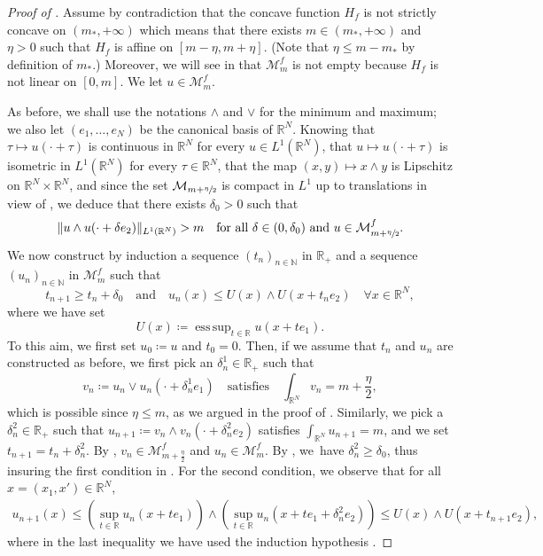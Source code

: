 \documentclass[JEP,XML,SOM,Unicode,published]{cedram}
\theoremstyle{plain}
\theoremstyle{definition}
\newcommand{\N}{\mathbb{N}}
\newcommand{\R}{\mathbb{R}}
\DeclarePairedDelimiter{\norm}{\lVert}{\rVert}
\DeclareMathOperator*{\esssup}{ess\,sup}
\begin{document}
\begin{proof}[Proof of ]
Assume by contradiction that the concave function \(H_f\) is not strictly concave on \((m_\ast,+\infty)\) which means that there exists \(m\in (m_\ast,+\infty)\) and \(\eta>0\) such that \(H_f\) is affine on \([m-\eta,m+\eta]\). (Note that \(\eta\leq m-m_\ast\) by definition of \(m_\ast\).) Moreover, we will see in  that \(\mathcal{M}^f_m\) is not empty because $H_f$ is not linear on $[0,m]$. We let \(u\in \mathcal{M}^f_m\).

As before, we shall use the notations \(\wedge\) and \(\vee\) for the minimum and maximum; we also let \((e_1,\dots,e_N)\) be the canonical basis of \(\R^N\). Knowing that \(\tau \mapsto u(\cdot+\tau)\) is continuous in $\R^N$ for every $u\in L^1(\R^N)$, that \(u\mapsto u(\cdot+\tau)\) is isometric in \(L^1(\R^N)\) for every \(\tau\in\R^N\), that the map \((x,y)\mapsto x\wedge y\) is Lipschitz on \(\R^N\times\R^N\), and since the set \(\mathcal{M}_{m+\sfrac{\eta}{2}}\) is compact in \(L^1\) up to translations in view of , we deduce that there exists \(\delta_0>0\) such that
\begin{equation}\label{UnifContTrans}
\norm{u\wedge u(\cdot+\delta e_2)}_{L^1(\R^N)}>m\quad\text{for all }\delta\in (0,\delta_0)\text{ and }u\in\mathcal{M}^f_{m+\sfrac{\eta}{2}}.
\end{equation}
We now construct by induction a sequence \((t_n)_{n\in\N}\) in \(\R_+\) and a sequence \((u_n)_{n\in\N}\) in \(\mathcal{M}^f_m\) such that
\begin{equation}\label{inductionHyp}
t_{n+1}\geq t_n+\delta_0\quad \text{and}\quad u_n(x)\leq U(x)\wedge U(x+ t_n e_2)\quad\forall x\in\R^N,
\end{equation}
where we have set
\[
U(x)\coloneqq \esssup_{t\in\R} u(x+t e_1).
\]
To this aim, we first set \(u_0\coloneqq u\) and \(t_0=0\). Then, if we assume that \(t_n\) and \(u_n\) are constructed as before, we first pick an \(\delta^1_n\in \R_+\) such that
\[
v_n\coloneqq u_n\vee u_n(\cdot+\delta^1_n e_1)\quad\text{satisfies}\quad\int_{\R^N} v_n=m+\frac{\eta}{2},
\]
which is possible since $\eta\leq m$, as we argued in the proof of . Similarly, we pick a \(\delta^2_n\in \R_+\) such that \(u_{n+1}\coloneqq v_n\wedge v_n(\cdot+\delta^2_n e_2)\) satisfies \(\int_{\R^N} u_{n+1}=m\), and we set \(t_{n+1}=t_n+\delta^2_n\). By , $v_n\in\mathcal{M}^f_{m+\frac{\eta}{2}}$ and $u_n\in\mathcal{M}^f_m$. By , we~have \(\delta^2_n\geq \delta_0\), thus insuring the first condition in . For the second condition, we observe that for all \(x=(x_1,x')\in\R^N\),
\begin{align*}
u_{n+1}(x)\leq(\sup_{t\in\R} u_n(x+t e_1))\wedge (\sup_{t\in\R}u_n(x+t e_1+\delta^2_n e_2))\leq U(x)\wedge U(x+t_{n+1}e_2),
\end{align*}
where in the last inequality we have used the induction hypothesis .


\end{proof}
\end{document}
